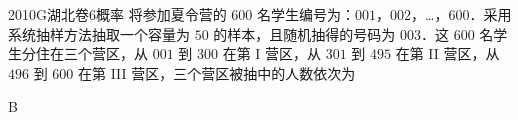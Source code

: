 
\begin{problem}{2010}{G}{湖北卷}{6}{概率}
将参加夏令营的 $ 600 $ 名学生编号为：$ 001 $，$ 002 $，…，$ 600 $．采用系统抽样方法抽取一个容量为 $ 50 $ 的样本，且随机抽得的号码为 $ 003 $．这 $ 600 $ 名学生分住在三个营区，从 $ 001 $ 到 $ 300 $ 在第 I 营区，从 $ 301 $ 到 $ 495 $ 在第 II 营区，从 $ 496 $ 到 $ 600 $ 在第 III 营区，三个营区被抽中的人数依次为
\begin{choices}
\end{choices}
\end{problem}

\begin{answer}
B
\end{answer}

\begin{solutions}

\end{solutions}